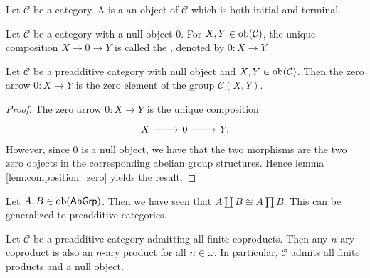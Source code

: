 \begin{definition}
	Let $\mathcal{C}$ be a category. A  is a an object of $\mathcal{C}$ which is both initial and terminal.
\end{definition}

\begin{definition}
	Let $\mathcal{C}$ be a category with a null object $0$. For $X,Y \in \operatorname{ob}(\mathcal{C})$, the unique composition $X \to 0 \to Y$ is called the , denoted by $0 : X \to Y$.
\end{definition}

\begin{lemma}
	\label{lem:zero_arrow}
	Let $\mathcal{C}$ be a preadditive category with null object and $X,Y \in \operatorname{ob}(\mathcal{C})$. Then the zero arrow $0 : X \to Y$ is the zero element of the group $\mathcal{C}(X,Y)$.
\end{lemma}

\begin{proof}
	The zero arrow $0 : X \to Y$ is the unique composition
	\begin{equation*}
		\begin{tikzcd}
			X \arrow[r] & 0 \arrow[r] & Y.
		\end{tikzcd}
	\end{equation*}
	However, since $0$ is a null object, we have that the two morphisms are the two zero objects in the corresponding abelian group structures. Hence lemma \ref{lem:composition_zero} yields the result.
\end{proof}

Let $A,B \in \operatorname{ob}(\mathsf{AbGrp})$. Then we have seen that $A \coprod B \cong A \prod B$. This can be generalized to preadditive categories.

\begin{proposition}
	\label{prop:products_and_coproducts_coincide}
	Let $\mathcal{C}$ be a preadditive category admitting all finite coproducts. Then any $n$-ary coproduct is also an $n$-ary product for all $n \in \omega$. In particular, $\mathcal{C}$ admits all finite products and a null object.
\end{proposition}

